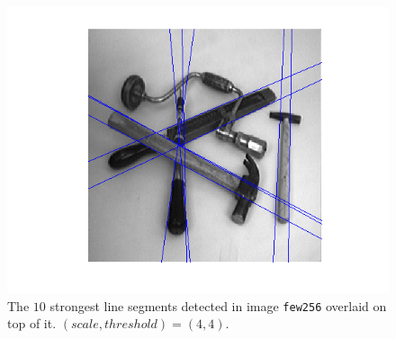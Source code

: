     \begin{figure}[H]
      \centering
      \includegraphics[scale=0.8]{./images/Q8/few256/1.png}
      \caption{The $10$ strongest line segments detected in image
        \texttt{few256} overlaid on top of it. $(scale, threshold) = (4,4)$.}
      \label{fig:Q8_few256_1}
    \end{figure}

